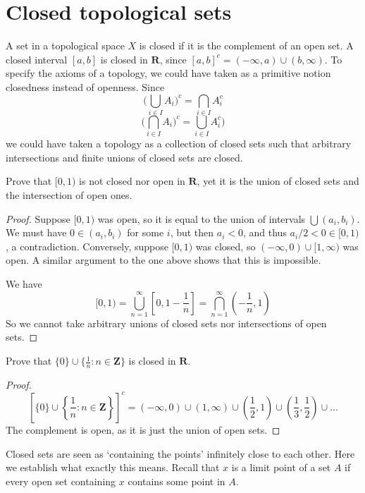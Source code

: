 \section{Closed topological sets}

A set in a topological space $X$ is closed if it is the complement of an open set. A closed interval $[a,b]$ is closed in $\mathbf{R}$, since $[a,b]^c = (-\infty, a) \cup (b,\infty)$. To specify the axioms of a topology, we could have taken as a primitive notion closedness instead of openness. Since
%
\[ \big( \bigcup_{i \in I} A_i \big)^c = \bigcap_{i \in I} A_i^c \]
%
\[ \big( \bigcap_{i \in I} A_i \big)^c = \bigcup_{i \in I} A_i^c \big) \]
%
we could have taken a topology as a collection of closed sets such that arbitrary intersections and finite unions of closed sets are closed.

\begin{exercise}
    Prove that $[0,1)$ is not closed nor open in $\mathbf{R}$, yet it is the union of closed sets and the intersection of open ones.
\end{exercise}
\begin{proof}
    Suppose $[0,1)$ was open, so it is equal to the union of intervals $\bigcup (a_i,b_i)$. We must have $0 \in (a_i, b_i)$ for some $i$, but then $a_i < 0$, and thus $a_i/2 < 0 \in [0,1)$, a contradiction. Conversely, suppose $[0,1)$ was closed, so $(-\infty, 0) \cup [1,\infty)$ was open. A similar argument to the one above shows that this is impossible.

    We have
    \[ [0,1) = \bigcup_{n = 1}^\infty \left[0, 1 - \frac{1}{n} \right] = \bigcap_{n = 1}^\infty (-\frac{1}{n}, 1) \]
    So we cannot take arbitrary unions of closed sets nor intersections of open sets.
\end{proof}

\begin{exercise}
    Prove that $\{0\} \cup \{ \frac{1}{n} : n \in \mathbf{Z} \}$ is closed in $\mathbf{R}$.
\end{exercise}
\begin{proof}
    \[ \left[\{0\} \cup \left\{ \frac{1}{n} : n \in \mathbf{Z} \right\}\right]^c = (-\infty, 0) \cup (1, \infty) \cup \left(\frac{1}{2},1\right) \cup \left(\frac{1}{3},\frac{1}{2}\right) \cup \dots \]
    The complement is open, as it is just the union of open sets.
\end{proof}

Closed sets are seen as `containing the points' infinitely close to each other. Here we establish what exactly this means. Recall that $x$ is a limit point of a set $A$ if every open set containing $x$ contains some point in $A$.

